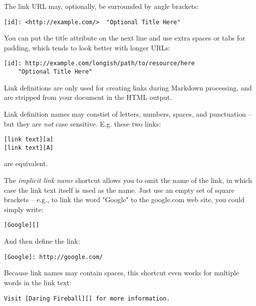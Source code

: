 The link URL may, optionally, be surrounded by angle brackets:

\begin{lstlisting}
[id]: <http://example.com/>  "Optional Title Here"
\end{lstlisting}




You can put the title attribute on the next line and use extra spaces
or tabs for padding, which tends to look better with longer URLs:

\begin{lstlisting}
[id]: http://example.com/longish/path/to/resource/here
    "Optional Title Here"
\end{lstlisting}




Link definitions are only used for creating links during Markdown
processing, and are stripped from your document in the HTML output.



Link definition names may constist of letters, numbers, spaces, and punctuation -- but they are \emph{not} case sensitive. E.g. these two links:

\begin{lstlisting}
[link text][a]
[link text][A]
\end{lstlisting}




are equivalent.



The \emph{implicit link name} shortcut allows you to omit the name of the
link, in which case the link text itself is used as the name.
Just use an empty set of square brackets -- e.g., to link the word
"Google" to the google.com web site, you could simply write:

\begin{lstlisting}
[Google][]
\end{lstlisting}




And then define the link:

\begin{lstlisting}
[Google]: http://google.com/
\end{lstlisting}




Because link names may contain spaces, this shortcut even works for
multiple words in the link text:

\begin{lstlisting}
Visit [Daring Fireball][] for more information.
\end{lstlisting}




